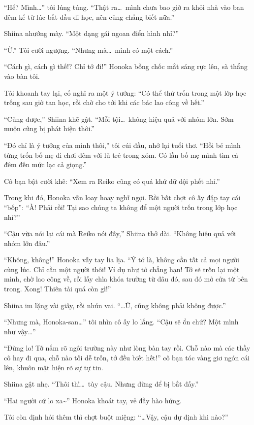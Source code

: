\documentclass[../main.tex]{subfiles}
\begin{document}
``Hể? Mình\dots'' tôi lúng túng. ``Thật ra\dots\ mình chưa bao giờ ra khỏi nhà vào ban đêm kể từ lúc bắt đầu đi học, nên cũng chẳng biết nữa.''

Shiina nhướng mày. ``Một dạng gái ngoan điển hình nhỉ?''

``Ừ.'' Tôi cười ngượng. ``Nhưng mà\dots\ mình có một cách.''

``Cách gì, cách gì thế!? Chỉ tớ đi!'' Honoka bỗng chốc mắt sáng rực lên, sà thẩng vào bàn tôi.

Tôi khoanh tay lại, cố nghĩ ra một ý tưởng: ``Có thể thử trốn trong một lớp học trống sau giờ tan học, rồi chờ cho tới khi các bác lao công về hết.''

``Cũng được,'' Shiina khẽ gật. ``Mỗi tội\dots\ không hiệu quả với nhóm lớn. Sớm muộn cũng bị phát hiện thôi.''

``Đó chỉ là ý tưởng của mình thôi,'' tôi cúi đầu, nhớ lại tuổi thơ. ``Hồi bé mình từng trốn bố mẹ đi chơi đêm với lũ trẻ trong xóm. Có lần bố mẹ mình tìm cả đêm đến mức lạc cả giọng.''

Cô bạn bật cười khẽ: ``Xem ra Reiko cũng có quá khứ dữ dội phết nhỉ.''

Trong khi đó, Honoka vẫn loay hoay nghĩ ngợi. Rồi bất chợt cô ấy đập tay cái ``bốp'': ``À! Phải rồi! Tại sao chúng ta không để một người trốn trong lớp học nhỉ?''

``Cậu vừa nói lại cái mà Reiko nói đấy,'' Shiina thở dài. ``Không hiệu quả với nhóm lớn đâu.''

``Không, không!'' Honoka vẫy tay lia lịa. ``Ý tớ là, không cần tất cả mọi người cùng lúc. Chỉ cần một người thôi! Ví dụ như tớ chẳng hạn! Tớ sẽ trốn lại một mình, chờ lao công về, rồi lấy chìa khóa trường từ đâu đó, sau đó mở cửa từ bên trong. Xong! Thiên tài quá còn gì!''

Shiina im lặng vài giây, rồi nhún vai. ``\dots Ừ, cũng không phải không được.''

``Nhưng mà, Honoka-san\dots'' tôi nhìn cô ấy lo lắng. ``Cậu sẽ ổn chứ? Một mình như vậy\dots''

``Đừng lo! Tớ nắm rõ ngôi trường này như lòng bàn tay rồi. Chỗ nào mà các thầy cô hay đi qua, chỗ nào tối dễ trốn, tớ đều biết hết!'' cô bạn tóc vàng giơ ngón cái lên, khuôn mặt hiện rõ sự tự tin.

Shiina gật nhẹ. ``Thôi thì\dots\ tùy cậu. Nhưng đừng để bị bắt đấy.''

``Hai người cứ lo xa\~{}'' Honoka khoát tay, vẻ đầy hào hứng.

Tôi còn định hỏi thêm thì chợt buột miệng: ``\dots Vậy, cậu dự định khi nào?''
\end{document}
